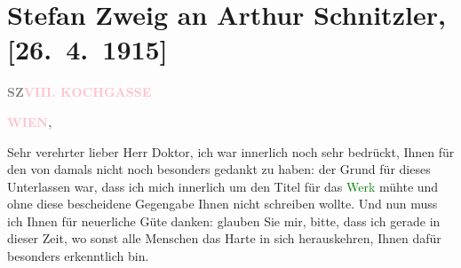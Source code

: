 

\renewcommand{\erwaehntePersonen}{Personen: Gustinus Ambrosi, Gerhart Hauptmann, Richard Rosenbaum, Arnold Rosé, Olga Schnitzler, Hugo Thimig, Bruno Walter, Berta Zuckerkandl, Stefan Zweig}
\renewcommand{\erwaehnteInstitutionen}{Institutionen: Burgtheater, K.K. Hof-Oper}
\renewcommand{\erwaehnteOrte}{Orte: Kochgasse 8, Musikverein, Wien, Wiener Konzerthaus}
\renewcommand{\erwaehnteWerke}{Werke: Das Lied von der Erde, Elektra [op. 58], Komödie der Worte. Drei Einakter}
\section[Stefan Zweig an Arthur Schnitzler, {[}26. 4. 1915{]}]{Stefan Zweig an Arthur Schnitzler, {[}26. 4. 1915{]}}
\nopagebreak{}
\rehead{ }\normalsize\beginnumbering{}
\toendnotes[C]{\smallbreak\pagebreak[2]}
\toendnotes[C]{\smallbreak}
\pstart
           {\pb}\textcolor{gray}{\textbf{SZ}}\hfill \textcolor{gray}{\textbf{\textcolor{pink}{VIII. KOCHGASSE}{}\ledrightnote{\textcolor{pink}{Kochgasse 8}}}}\pend
           
\pstart
           \raggedleft{}\textcolor{gray}{\textbf{\textcolor{pink}{WIEN}{}\ledrightnote{\textcolor{pink}{Wien}},}}\pend
           
\pstart{}Sehr verehrter lieber Herr Doktor,\pend
\pstart
           ich war innerlich noch sehr bedrückt, Ihnen für den \label{K_L03654-1v}\label{K_L03654-1h} von damals nicht noch besonders gedankt zu haben:
               der Grund für dieses Unterlassen war, dass ich mich innerlich um den Titel für das
                  \textcolor{green}{Werk}{}\ledrightnote{{$\rightarrow$}\textcolor{green}{Komödie der Worte. Drei Einakter}} mühte und ohne diese
               bescheidene Gegengabe Ihnen nicht schreiben wollte. Und nun muss ich Ihnen für
               neuerliche Güte danken: glauben Sie mir, bitte, dass ich gerade in dieser Zeit, wo
               sonst alle Menschen das Harte in sich herauskehren, Ihnen dafür besonders erkenntlich
                  {\pb}bin.\pend
           
